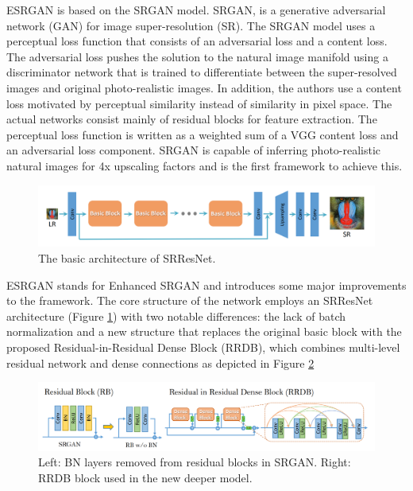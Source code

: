 ESRGAN is based on the SRGAN\cite{ledig2017photorealistic} model. SRGAN, is a generative adversarial network (GAN) for image super-resolution (SR). The SRGAN model uses a perceptual loss function that consists of an adversarial loss and a content loss. The adversarial loss pushes the solution to the natural image manifold using a discriminator network that is trained to differentiate between the super-resolved images and original photo-realistic images. In addition, the authors use a content loss motivated by perceptual similarity instead of similarity in pixel space. The actual networks consist mainly of residual blocks for feature extraction. The perceptual loss function is written as a weighted sum of a VGG content loss and an adversarial loss component. SRGAN is capable of inferring photo-realistic natural images for 4x upscaling factors and is the first framework to achieve this.

\begin{figure}[H]
  \centering
  \includegraphics[scale=0.25]{figures/SRResNet.png}
  \caption{The basic architecture of SRResNet\cite{wang2018esrgan}.}
  \label{img:SRResNet}
\end{figure}

ESRGAN stands for Enhanced SRGAN and introduces some major improvements to the framework. The core structure of the network employs an SRResNet architecture (Figure \ref{img:SRResNet}) with two notable differences: the lack of batch normalization and a new structure that replaces the original basic block with the proposed Residual-in-Residual Dense Block (RRDB), which combines multi-level residual network and dense
connections as depicted in Figure \ref{img:RRDB}

\begin{figure}[H]
  \centering
  \includegraphics[scale=0.25]{figures/RRDB.png}
  \caption{Left: BN layers removed from residual blocks in SRGAN. Right: RRDB block used in the new deeper model.\cite{wang2018esrgan}}
  \label{img:RRDB}
\end{figure}



